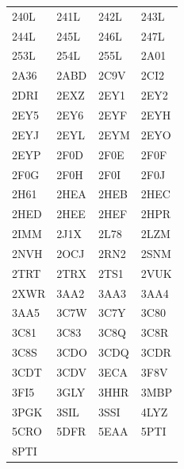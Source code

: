 \begin{longtable}{p{} p{} p{} p{}}
240L & 241L & 242L & 243L \\
244L & 245L & 246L & 247L \\
253L & 254L & 255L & 2A01 \\
2A36 & 2ABD & 2C9V & 2CI2 \\
2DRI & 2EXZ & 2EY1 & 2EY2 \\
2EY5 & 2EY6 & 2EYF & 2EYH \\
2EYJ & 2EYL & 2EYM & 2EYO \\
2EYP & 2F0D & 2F0E & 2F0F \\
2F0G & 2F0H & 2F0I & 2F0J \\
2H61 & 2HEA & 2HEB & 2HEC \\
2HED & 2HEE & 2HEF & 2HPR \\
2IMM & 2J1X & 2L78 & 2LZM \\
2NVH & 2OCJ & 2RN2 & 2SNM \\
2TRT & 2TRX & 2TS1 & 2VUK \\
2XWR & 3AA2 & 3AA3 & 3AA4 \\
3AA5 & 3C7W & 3C7Y & 3C80 \\
3C81 & 3C83 & 3C8Q & 3C8R \\
3C8S & 3CDO & 3CDQ & 3CDR \\
3CDT & 3CDV & 3ECA & 3F8V \\
3FI5 & 3GLY & 3HHR & 3MBP \\
3PGK & 3SIL & 3SSI & 4LYZ \\
5CRO & 5DFR & 5EAA & 5PTI \\
8PTI &  &  &  \\
\hline
\end{longtable}
